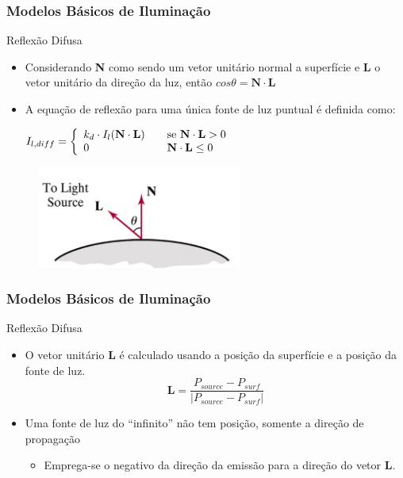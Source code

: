 \documentclass{beamer}
\begin{document}
\begin{frame}
\frametitle{Modelos Básicos de Iluminação}

	\begin{block}{Reflexão Difusa}
		\begin{itemize}
			\item Considerando \textbf{N} como sendo um vetor unitário normal a superfície e \textbf{L} o vetor unitário da direção da luz, então $cos \theta = \textbf{N} \cdot \textbf{L}$
			\item A equação de reflexão para uma única fonte de luz puntual é definida como:
				
				$I_{l,diff} = \left\{
					\begin{array}{l l}
   						 k_d \cdot I_l(\textbf{N} \cdot \textbf{L}) & \quad \text{se } \textbf{N} \cdot \textbf{L} > 0\\
    						0 & \quad \textbf{N} \cdot \textbf{L} \leq 0 
  					\end{array} \right.$
		\end{itemize}
	\end{block}
	
	\begin{figure}[!h]
		\begin{center}
		\includegraphics[width=0.6\textwidth]{Figures/RefDifInt}
		\end{center}
	\end{figure}	

\end{frame}

\begin{frame}
\frametitle{Modelos Básicos de Iluminação}

	\begin{block}{Reflexão Difusa}
		\begin{itemize}
			\item O vetor unitário \textbf{L} é calculado usando a posição da superfície e a posição da fonte de luz.
			\begin{equation*}
				\textbf{L} = \frac{P_{source} - P_{surf}}{| P_{source} - P_{surf}|}
			\end{equation*}
			\item Uma fonte de luz do ``infinito'' não tem posição, somente a direção de propagação
				\begin{itemize}
					\item Emprega-se o negativo da direção da emissão para a direção do vetor \textbf{L}.
				\end{itemize}				 
		\end{itemize}
	\end{block}
\end{frame}
\end{document}
